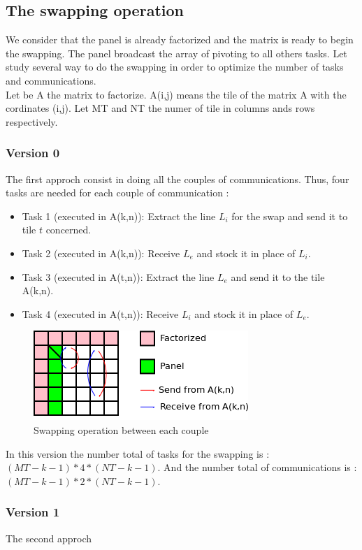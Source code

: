 \documentclass{report}
\begin{document}
\subsection{The swapping operation}
We consider that the panel is already factorized and the matrix is ready to begin the swapping. The panel broadcast the array of pivoting to all others tasks. Let study several way to do the swapping in order to optimize the number of tasks and communications.\\
Let be A the matrix to factorize. A(i,j) means the tile of the matrix A with the cordinates (i,j). Let MT and NT the numer of tile in columns ands rows respectively.

\subsubsection*{Version 0}
The first approch consist in doing all the couples of communications. Thus, four tasks are needed for each couple of communication :
\begin{itemize}
\item Task 1 (executed in A(k,n)): Extract the line $L_i$ for the swap and send it to tile $t$ concerned.
\item Task 2 (executed in A(k,n)): Receive $L_e$ and stock it in place of $L_i$.
\item Task 3 (executed in A(t,n)): Extract the line $L_e$ and send it to the tile A(k,n).
\item Task 4 (executed in A(t,n)): Receive $L_i$ and stock it in place of $L_e$.
\end{itemize}
\begin{figure}[!ht]
\begin{center}
\includegraphics[scale=1]{version0.png} 
\end{center}
\caption{Swapping operation between each couple}
\end{figure}
In this version the number total of tasks for the swapping is : $(MT-k-1)*4*(NT-k-1)$.
And the number total of communications is : $(MT-k-1)*2*(NT-k-1)$.
\subsubsection*{Version 1}
The second approch 
\end{document}

